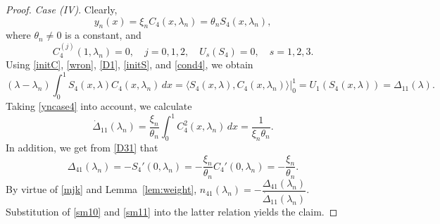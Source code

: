 \documentclass[a4paper,12pt]{article}
\newcommand{\la}{\lambda}
\theoremstyle{plain}
\numberwithin{equation}{section}
\theoremstyle{definition}
\theoremstyle{remark}
\begin{document}
\begin{proof}
\smallskip

\textit{Case (IV)}. Clearly, 
\begin{equation} \label{yncase4}
y_n(x) = \xi_n C_4(x, \la_n) = \theta_n S_4(x, \la_n), 
\end{equation}
where $\theta_n \ne 0$ is a constant, and 
\begin{equation} \label{cond4}
C_4^{(j)}(1, \la_n) = 0, \quad j = 0,1,2, \quad U_s(S_4) = 0, \quad s = 1, 2, 3.
\end{equation}
Using \eqref{initC}, \eqref{wron}, \eqref{D1}, \eqref{initS}, and \eqref{cond4},  we obtain
$$
(\la - \la_n) \int_0^1 S_4(x, \la) C_4(x, \la_n) \, dx = \langle S_4(x, \la), C_4(x, \la_n) \rangle \big|_0^1 = U_1(S_4(x, \la)) = \Delta_{11}(\la).
$$
Taking \eqref{yncase4} into account, we calculate 
\begin{equation} \label{sm10}
\dot \Delta_{11}(\la_n) = \frac{\xi_n}{\theta_n} \int_0^1 C_4^2(x, \la_n) \, dx = \frac{1}{\xi_n \theta_n}. 
\end{equation}
In addition, we get from \eqref{D31} that 
\begin{equation} \label{sm11}
\Delta_{41}(\la_n) = -S_4'(0, \la_n) = -\frac{\xi_n}{\theta_n} C_4'(0, \la_n) = -\frac{\xi_n}{\theta_n}.
\end{equation}
By virtue of \eqref{mjk} and Lemma~\ref{lem:weight}, $n_{41}(\la_n) = -\dfrac{\Delta_{41}(\la_n)}{\dot \Delta_{11}(\la_n)}$. Substitution of \eqref{sm10} and \eqref{sm11} into the latter relation yields the claim. 
\end{proof}
\end{document}
